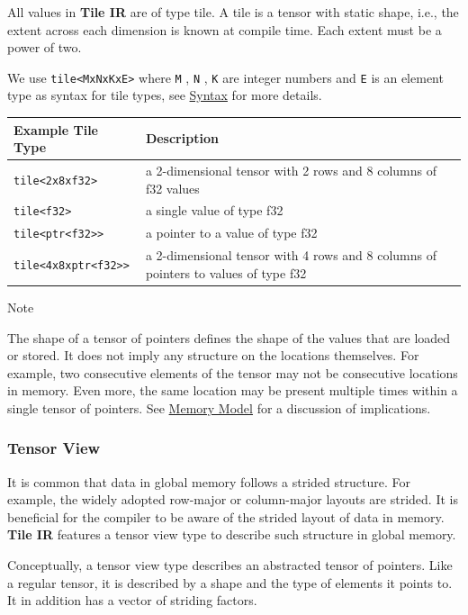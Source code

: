 \documentclass{article}
\begin{document}
All values in \textbf{Tile IR} are of type tile. A tile is a tensor with static shape, i.e., the extent across each dimension is known at compile time. Each extent must be a power of two.


We use \texttt{tile<MxNxKxE>} where \texttt{M} , \texttt{N} , \texttt{K} are integer numbers and \texttt{E} is an element type as syntax for tile types, see \href{https://docs.nvidia.com/cuda/tile-ir/latest/sections/syntax.html#section-syntax}{Syntax} for more details.


\begin{longtable}{l|l}
\hline
Example Tile Type & Description \\ \hline
\texttt{tile<2x8xf32>} & a 2-dimensional tensor with 2 rows and 8 columns of f32 values \\ \hline
\texttt{tile<f32>} & a single value of type f32 \\ \hline
\texttt{tile<ptr<f32>>} & a pointer to a value of type f32 \\ \hline
\texttt{tile<4x8xptr<f32>>} & a 2-dimensional tensor with 4 rows and 8 columns of pointers to values of type f32 \\ \hline
\end{longtable}


Note


The shape of a tensor of pointers defines the shape of the values that are loaded or stored. It does not imply any structure on the locations themselves. For example, two consecutive elements of the tensor may not be consecutive locations in memory. Even more, the same location may be present multiple times within a single tensor of pointers. See \href{https://docs.nvidia.com/cuda/tile-ir/latest/sections/memory_model.html#section-memory-model}{Memory Model} for a discussion of implications.



\subsubsection{Tensor View}

It is common that data in global memory follows a strided structure. For example, the widely adopted row-major or column-major layouts are strided. It is beneficial for the compiler to be aware of the strided layout of data in memory. \textbf{Tile IR} features a tensor view type to describe such structure in global memory.


Conceptually, a tensor view type describes an abstracted tensor of pointers. Like a regular tensor, it is described by a shape and the type of elements it points to. It in addition has a vector of striding factors.
\end{document}
